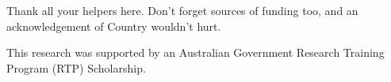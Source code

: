 %
Thank all your helpers here. Don't forget sources of funding too, and an acknowledgement of Country wouldn't hurt. 

This research was supported by an Australian Government Research Training Program (RTP) Scholarship. %
